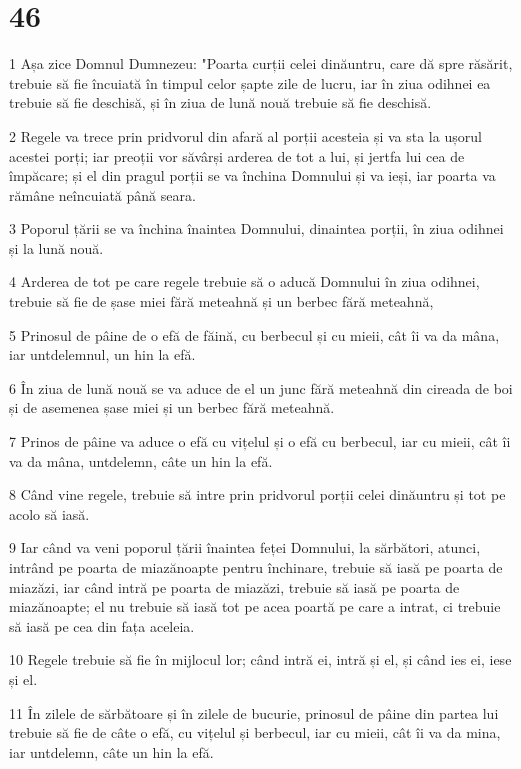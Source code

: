 \chapter{46}

\par 1 Așa zice Domnul Dumnezeu: "Poarta curții celei dinăuntru, care dă spre răsărit, trebuie să fie încuiată în timpul celor șapte zile de lucru, iar în ziua odihnei ea trebuie să fie deschisă, și în ziua de lună nouă trebuie să fie deschisă.
\par 2 Regele va trece prin pridvorul din afară al porții acesteia și va sta la ușorul acestei porți; iar preoții vor săvârși arderea de tot a lui, și jertfa lui cea de împăcare; și el din pragul porții se va închina Domnului și va ieși, iar poarta va rămâne neîncuiată până seara.
\par 3 Poporul țării se va închina înaintea Domnului, dinaintea porții, în ziua odihnei și la lună nouă.
\par 4 Arderea de tot pe care regele trebuie să o aducă Domnului în ziua odihnei, trebuie să fie de șase miei fără meteahnă și un berbec fără meteahnă,
\par 5 Prinosul de pâine de o efă de făină, cu berbecul și cu mieii, cât îi va da mâna, iar untdelemnul, un hin la efă.
\par 6 În ziua de lună nouă se va aduce de el un junc fără meteahnă din cireada de boi și de asemenea șase miei și un berbec fără meteahnă.
\par 7 Prinos de pâine va aduce o efă cu vițelul și o efă cu berbecul, iar cu mieii, cât îi va da mâna, untdelemn, câte un hin la efă.
\par 8 Când vine regele, trebuie să intre prin pridvorul porții celei dinăuntru și tot pe acolo să iasă.
\par 9 Iar când va veni poporul țării înaintea feței Domnului, la sărbători, atunci, intrând pe poarta de miazănoapte pentru închinare, trebuie să iasă pe poarta de miazăzi, iar când intră pe poarta de miazăzi, trebuie să iasă pe poarta de miazănoapte; el nu trebuie să iasă tot pe acea poartă pe care a intrat, ci trebuie să iasă pe cea din fața aceleia.
\par 10 Regele trebuie să fie în mijlocul lor; când intră ei, intră și el, și când ies ei, iese și el.
\par 11 În zilele de sărbătoare și în zilele de bucurie, prinosul de pâine din partea lui trebuie să fie de câte o efă, cu vițelul și berbecul, iar cu mieii, cât îi va da mina, iar untdelemn, câte un hin la efă.
